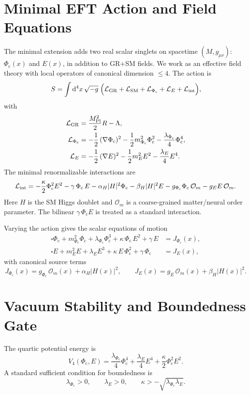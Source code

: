 \documentclass[reprint,amsmath,amssymb,aps,showkeys]{revtex4-2}
\newcommand{\dd}{\mathrm{d}}
\newcommand{\Phic}{\Phi_{\mathrm{c}}}
\newcommand{\Eth}{E}
\newcommand{\Mpl}{M_{\mathrm{Pl}}}
\newcommand{\Lag}{\mathcal{L}}
\newcommand{\cO}{\mathcal{O}}
\begin{document}
\section{Minimal EFT Action and Field Equations}
The minimal extension adds two real scalar singlets on spacetime $(M,g_{\mu\nu})$: $\Phic(x)$ and $\Eth(x)$, in addition to GR+SM fields. We work as an effective field theory with local operators of canonical dimension $\le 4$. The action is
\begin{equation}
S=\int \dd^4x\,\sqrt{-g}\;\Big(\Lag_{\rm GR}+\Lag_{\rm SM}+\Lag_{\Phic}+\Lag_{\Eth}+\Lag_{\rm int}\Big),
\label{eq:action}
\end{equation}
with
\begin{align}
\Lag_{\rm GR} &= \frac{\Mpl^2}{2}R-\Lambda,
\\
\Lag_{\Phic} &= -\frac12\,(\nabla \Phic)^2 - \frac12 m_{\Phic}^2 \Phic^2 - \frac{\lambda_{\Phic}}{4}\Phic^4,
\\
\Lag_{\Eth} &= -\frac12\,(\nabla \Eth)^2 - \frac12 m_{\Eth}^2 \Eth^2 - \frac{\lambda_{\Eth}}{4}\Eth^4.
\end{align}
The minimal renormalizable interactions are
\begin{equation}
\Lag_{\rm int}
=
-\frac{\kappa}{2}\Phic^2\Eth^2
-\gamma\,\Phic\,\Eth
-\alpha_H |H|^2 \Phic
-\beta_H |H|^2 \Eth
-g_{\Phic}\Phic\,\cO_m
-g_{\Eth}\Eth\,\cO_m.
\label{eq:int}
\end{equation}
Here $H$ is the SM Higgs doublet and $\cO_m$ is a coarse-grained matter/neural order parameter. The bilinear $\gamma\,\Phic\Eth$ is treated as a standard interaction.

Varying the action gives the scalar equations of motion
\begin{align}
\square \Phic + m_{\Phic}^2 \Phic + \lambda_{\Phic}\Phic^3 + \kappa\,\Phic\,\Eth^2 + \gamma\,\Eth &= J_{\Phic}(x),
\\
\square \Eth + m_{\Eth}^2 \Eth + \lambda_{\Eth}\Eth^3 + \kappa\,\Eth\,\Phic^2 + \gamma\,\Phic &= J_{\Eth}(x),
\end{align}
with canonical source terms
\begin{equation}
J_{\Phic}(x)=g_{\Phic}\,\cO_m(x)+\alpha_H |H(x)|^2,\qquad
J_{\Eth}(x)=g_{\Eth}\,\cO_m(x)+\beta_H |H(x)|^2.
\end{equation}

\section{Vacuum Stability and Boundedness Gate}
The quartic potential energy is
\[
V_4(\Phic,\Eth)=\frac{\lambda_{\Phic}}{4}\Phic^4+\frac{\lambda_{\Eth}}{4}\Eth^4+\frac{\kappa}{2}\Phic^2\Eth^2.
\]
A standard sufficient condition for boundedness is
\begin{equation}
\lambda_{\Phic}>0,\qquad \lambda_{\Eth}>0,\qquad \kappa>-\sqrt{\lambda_{\Phic}\lambda_{\Eth}}.
\label{eq:stability}
\end{equation}
\end{document}
